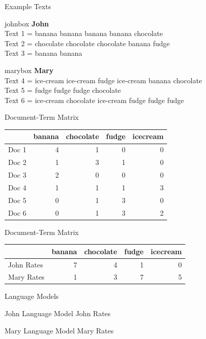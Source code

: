 \documentclass[11pt,aspectratio=43]{beamer}
\begin{document}
\begin{frame}{Example Texts}
\scriptsize
\begin{beamercolorbox}[rounded=true,shadow=true,sep=.7ex,wd=\textwidth]{johnbox}
\textbf{John}\\
Text 1 = banana banana banana banana chocolate\\
Text 2 = chocolate chocolate chocolate banana fudge\\
Text 3 = banana banana
\end{beamercolorbox}
\vspace{.7em}
\begin{beamercolorbox}[rounded=true,shadow=true,sep=.7ex,wd=\textwidth]{marybox}
\textbf{Mary}\\
Text 4 = ice-cream ice-cream fudge ice-cream banana chocolate\\
Text 5 = fudge fudge fudge chocolate\\
Text 6 = ice-cream chocolate ice-cream fudge fudge fudge
\end{beamercolorbox}
\end{frame}

\begin{frame}{Document-Term Matrix}
\centering
\small
\begin{tabular}{l|rrrr}
 & banana & chocolate & fudge & icecream\\ \hline
Doc 1&4&1&0&0\\
Doc 2&1&3&1&0\\
Doc 3&2&0&0&0\\
Doc 4&1&1&1&3\\
Doc 5&0&1&3&0\\
Doc 6&0&1&3&2
\end{tabular}
\end{frame}

\begin{frame}{Document-Term Matrix}
\centering
\small
\begin{tabular}{l|rrrr}
 & banana & chocolate & fudge & icecream\\ \hline
John Rates&7&4&1&0\\
Mary Rates&1&3&7&5
\end{tabular}
\end{frame}

\begin{frame}{Language Models}
\begin{block}{John Language Model}
John Rates    
\end{block}
\vspace{1em}
\begin{exampleblock}{Mary Language Model}
Mary Rates    
\end{exampleblock}
\end{frame}
\end{document}
